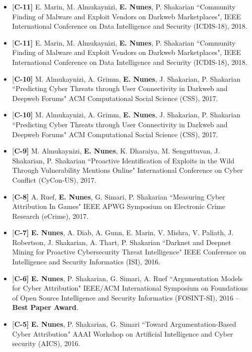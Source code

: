 \documentclass[margin,line]{CV}
\begin{document}
\begin{resume}
\begin{itemize}[leftmargin =*]
\item {[\bf C-11]} E. Marin, M. Almukaynizi, {\bf E. Nunes}, P. Shakarian ``Community Finding of Malware and Exploit Vendors on Darkweb Marketplaces", IEEE International Conference on Data Intelligence and Security (ICDIS-18), 2018.

\item {[\bf C-11]} E. Marin, M. Almukaynizi, {\bf E. Nunes}, P. Shakarian ``Community Finding of Malware and Exploit Vendors on Darkweb Marketplaces", IEEE International Conference on Data Intelligence and Security (ICDIS-18), 2018.

\item {[\bf C-10]} M. Almukaynizi, A. Grimm, {\bf E. Nunes}, J. Shakarian, P. Shakarian  ``Predicting Cyber Threats through User Connectivity in Darkweb and Deepweb Forums" ACM Computational Social Science (CSS), 2017.

\item {[\bf C-10]} M. Almukaynizi, A. Grimm, {\bf E. Nunes}, J. Shakarian, P. Shakarian  ``Predicting Cyber Threats through User Connectivity in Darkweb and Deepweb Forums" ACM Computational Social Science (CSS), 2017.

\item {[\bf C-9]} M. Almukaynizi, {\bf E. Nunes}, K. Dharaiya, M. Senguttuvan, J. Shakarian, P. Shakarian  ``Proactive Identification of Exploits in the Wild Through Vulnerability Mentions Online" International Conference on Cyber Conflict (CyCon-US), 2017.


\item {[\bf C-8]} A. Ruef, {\bf E. Nunes}, G. Simari, P. Shakarian  ``Measuring Cyber Attribution In Games" IEEE APWG Symposium on Electronic Crime Research (eCrime), 2017.


\item {[\bf C-7]} {\bf E. Nunes}, A. Diab, A. Gunn, E. Marin, V. Mishra, V. Paliath, J. Robertson, J. Shakarian, A. Thart, P. Shakarian ``Darknet and Deepnet Mining for Proactive Cybersecurity Threat Intelligence" IEEE Conference on Intelligence and Security Informatics (ISI), 2016.

\item {[\bf C-6]} {\bf E. Nunes}, P. Shakarian, G. Simari, A. Ruef  ``Argumentation Models for Cyber Attribution"
IEEE/ACM International Symposium on Foundations of Open Source Intelligence and Security Informatics (FOSINT-SI), 2016 -- {\bf Best Paper Award}.

\item {[\bf C-5]} {\bf E. Nunes}, P. Shakarian, G. Simari ``Toward Argumentation-Based Cyber Attribution"
AAAI Workshop on Artificial Intelligence and Cyber security (AICS), 2016.


\end{itemize}
\end{resume}
\end{document}
